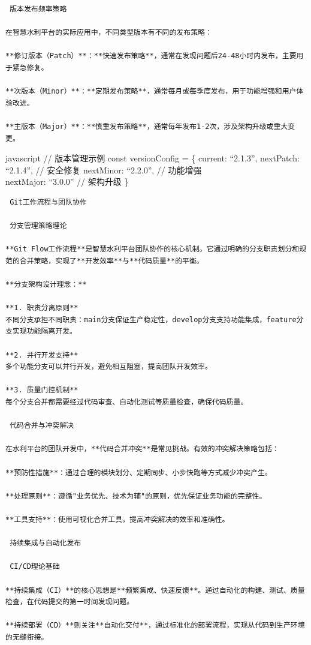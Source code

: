 {{\begin{lstlisting}
 版本发布频率策略

在智慧水利平台的实际应用中，不同类型版本有不同的发布策略：

**修订版本（Patch）**：**快速发布策略**，通常在发现问题后24-48小时内发布，主要用于紧急修复。

**次版本（Minor）**：**定期发布策略**，通常每月或每季度发布，用于功能增强和用户体验改进。

**主版本（Major）**：**慎重发布策略**，通常每年发布1-2次，涉及架构升级或重大变更。
\end{lstlisting}

javascript // 版本管理示例 const versionConfig = \{ current: ``2.1.3'', nextPatch: ``2.1.4'', // 安全修复 nextMinor: ``2.2.0'', // 功能增强\\
nextMajor: ``3.0.0'' // 架构升级 \}

\begin{lstlisting}
 Git工作流程与团队协作

 分支管理策略理论

**Git Flow工作流程**是智慧水利平台团队协作的核心机制。它通过明确的分支职责划分和规范的合并策略，实现了**开发效率**与**代码质量**的平衡。

**分支架构设计理念：**

**1. 职责分离原则**
不同分支承担不同职责：main分支保证生产稳定性，develop分支支持功能集成，feature分支实现功能隔离开发。

**2. 并行开发支持**
多个功能分支可以并行开发，避免相互阻塞，提高团队开发效率。

**3. 质量门控机制**
每个分支合并都需要经过代码审查、自动化测试等质量检查，确保代码质量。

 代码合并与冲突解决

在水利平台的团队开发中，**代码合并冲突**是常见挑战。有效的冲突解决策略包括：

**预防性措施**：通过合理的模块划分、定期同步、小步快跑等方式减少冲突产生。

**处理原则**：遵循"业务优先、技术为辅"的原则，优先保证业务功能的完整性。

**工具支持**：使用可视化合并工具，提高冲突解决的效率和准确性。

 持续集成与自动化发布

 CI/CD理论基础

**持续集成（CI）**的核心思想是**频繁集成、快速反馈**。通过自动化的构建、测试、质量检查，在代码提交的第一时间发现问题。

**持续部署（CD）**则关注**自动化交付**，通过标准化的部署流程，实现从代码到生产环境的无缝衔接。


\end{lstlisting}}}
